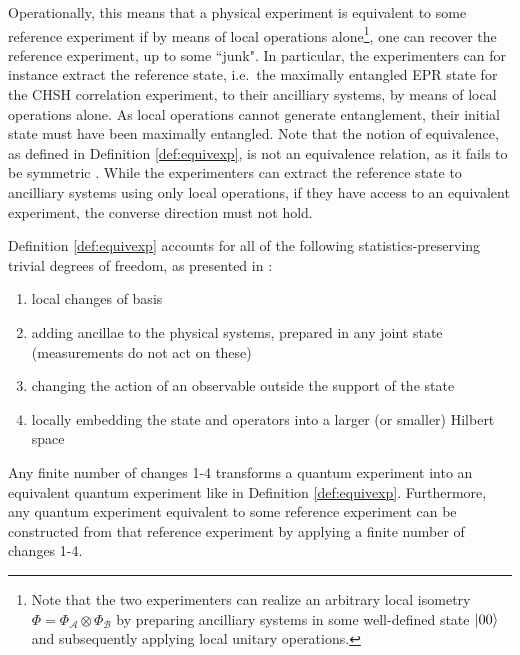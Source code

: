 Operationally, this means that a physical experiment is equivalent to some reference experiment if by means of local operations alone\footnote{Note that the two experimenters can realize an arbitrary local isometry $\Phi=\Phi_{\mathcal{A}}\otimes\Phi_{\mathcal{B}}$ by preparing ancilliary systems in some well-defined state $\ket{00}$ and subsequently applying local unitary operations.}, one can recover the reference experiment, up to some ``junk". In particular, the experimenters can for instance extract the reference state, i.e.\ the maximally entangled EPR state for the CHSH correlation experiment, to their ancilliary systems, by means of local operations alone. As local operations cannot generate entanglement, their initial state must have been maximally entangled. Note that the notion of equivalence, as defined in Definition \ref{def:equivexp}, is not an equivalence relation, as it fails to be symmetric \cite{McKague2011}.  While the experimenters can extract the reference state to ancilliary systems using only local operations, if they have access to an equivalent experiment, the converse direction must not hold.

Definition \ref{def:equivexp} accounts for all of the following statistics-preserving trivial degrees of freedom, as presented in \cite{McKague2011}:
\begin{enumerate}
    \item local changes of basis
    \item adding ancillae to the physical systems, prepared in any joint state (measurements do not act on these)
    \item changing the action of an observable outside the support of the state
    \item locally embedding the state and operators into a larger (or smaller) Hilbert space
\end{enumerate}

\begin{claim}
Any finite number of changes 1-4 transforms a quantum experiment into an equivalent quantum experiment like in Definition \ref{def:equivexp}. Furthermore, any quantum experiment equivalent to some reference experiment can be constructed from that reference experiment by applying  a finite number of changes 1-4.
\end{claim}

